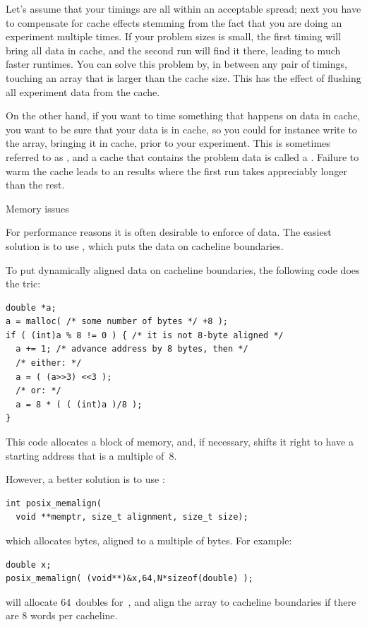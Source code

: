 Let's assume that your timings are all within an acceptable spread;
next you have to compensate for cache effects stemming from the fact that
you are doing an experiment multiple times. If your problem sizes is small,
the first timing will bring all data in cache, and the second run
will find it there, leading to much faster runtimes. You can solve this 
problem by, in between any pair of timings, touching an array
that is larger than the cache size. This has the effect of flushing
all experiment data from the cache.

On the other hand, if you want to time something that happens on data
in cache, you want to be sure that your data is in cache, so you could
for instance write to the array, bringing it in cache, prior to your
experiment. This is sometimes referred to
as , and a cache that contains the
problem data is called a . Failure to warm
the cache leads to an results where the first run takes appreciably 
longer than the rest.

 {Memory issues}
\label{sec:memalign}

For performance reasons it is often desirable to enforce
 of data.
The easiest solution is to use ,
which puts the data on cacheline boundaries.

To put dynamically aligned data on cacheline boundaries, the
following code does the tric:
\begin{verbatim}
double *a;
a = malloc( /* some number of bytes */ +8 );
if ( (int)a % 8 != 0 ) { /* it is not 8-byte aligned */
  a += 1; /* advance address by 8 bytes, then */
  /* either: */
  a = ( (a>>3) <<3 );
  /* or: */
  a = 8 * ( ( (int)a )/8 );
}
\end{verbatim}
This code allocates a block of memory, and, if necessary, shifts it
right to have a starting address that is a multiple of~8.

However, a better solution is to use :
\begin{verbatim}
int posix_memalign(
  void **memptr, size_t alignment, size_t size);
\end{verbatim}
which allocates  bytes, aligned to a multiple of  bytes.
For example:
\begin{verbatim}
double x;
posix_memalign( (void**)&x,64,N*sizeof(double) );
\end{verbatim}
will allocate 64~doubles for~, and align the array
to cacheline boundaries if there are 8 words per cacheline.

